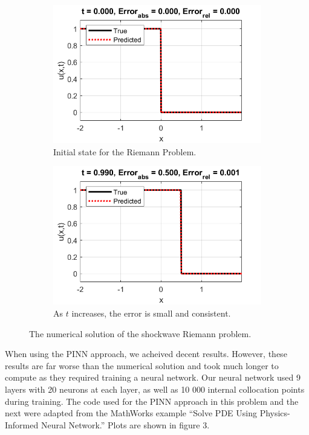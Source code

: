 \documentclass{myproject}
\begin{document}
\begin{figure}
\centering
    \begin{subfigure}{.48\textwidth}
        \centering
        \includegraphics[width=1.0\textwidth]{t0_shockwave.png}
        \caption{Initial state for the Riemann Problem.}
    \end{subfigure}\hfill
    \begin{subfigure}{.48\textwidth}
        \centering
        \includegraphics[width=1\textwidth]{t05_shockwave.png}
        \caption{As $t$ increases, the error is small and consistent.}
    \end{subfigure}
    \caption{The numerical solution of the shockwave Riemann problem.}
\end{figure}

When using the PINN approach, we acheived decent results. However, these results are far worse than the numerical solution and took much longer to compute as they required training a neural network. Our neural network used 9 layers with 20 neurons at each layer, as well as 10 000 internal collocation points during training. The code used for the PINN approach in this problem and the next were adapted from the MathWorks example ``Solve PDE Using Physics-Informed Neural Network.'' Plots are shown in figure 3.
\end{document}
